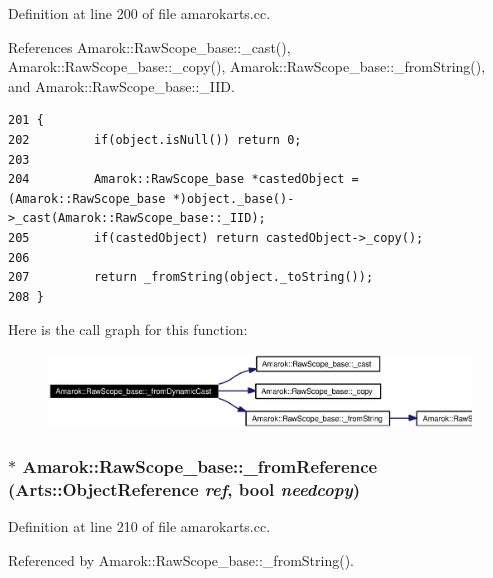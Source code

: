Definition at line 200 of file amarokarts.cc.

References Amarok::Raw\-Scope\_\-base::\_\-cast(), Amarok::Raw\-Scope\_\-base::\_\-copy(), Amarok::Raw\-Scope\_\-base::\_\-from\-String(), and Amarok::Raw\-Scope\_\-base::\_\-IID.



\footnotesize\begin{verbatim}201 {
202         if(object.isNull()) return 0;
203 
204         Amarok::RawScope_base *castedObject = (Amarok::RawScope_base *)object._base()->_cast(Amarok::RawScope_base::_IID);
205         if(castedObject) return castedObject->_copy();
206 
207         return _fromString(object._toString());
208 }
\end{verbatim}\normalsize 


Here is the call graph for this function:\begin{figure}[H]
\begin{center}
\leavevmode
\includegraphics[width=366pt]{classAmarok_1_1RawScope__base_Amarok_1_1RawScope__stube3_cgraph}
\end{center}
\end{figure}
\subsubsection{ $\ast$ Amarok::Raw\-Scope\_\-base::\_\-from\-Reference (Arts::Object\-Reference {\em ref}, bool {\em needcopy})\hspace{0.3cm}{\tt  [static, inherited]}}\label{classAmarok_1_1RawScope__base_Amarok_1_1RawScope__stube2}




Definition at line 210 of file amarokarts.cc.

Referenced by Amarok::Raw\-Scope\_\-base::\_\-from\-String().



